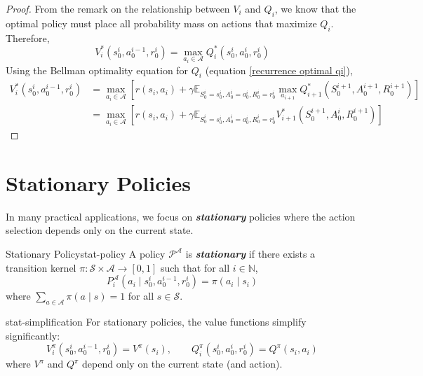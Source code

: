 \documentclass[a4paper, 11pt]{article}
\numberwithin{equation}{section}
\theoremstyle{plain}
\theoremstyle{definition}
\newcommand{\E}{{\mathbb E}}
\newcommand{\1}{{\mathbbm 1}}
\newcommand{\mc}[1]{\mathcal{#1}}
\newcommand{\bi}[1]{\textbf{\textit{#1}}}
\newcommand{\N}{{\mathbb{N}}}
\begin{document}
	\begin{proof}
		From the remark on the relationship between $V_i$ and $Q_i$, we know that the optimal policy must place all probability mass on actions that maximize $Q_i$. Therefore,
		\begin{equation*}
			V_i^{*}(s_0^i, a_0^{i-1}, r_0^i) = \max_{a_i \in \mc{A}} Q_i^{*}(s_0^i, a_0^{i}, r_0^i)
		\end{equation*}
		Using the Bellman optimality equation for $Q_i$ (equation \eqref{recurrence optimal qi}),
		\begin{equation*}
			\begin{split}
				V_i^{*}(s_0^i, a_0^{i-1}, r_0^i) &= \max_{a_i \in \mc{A}} \left[ r(s_i, a_i) + \gamma\E_{S_0^i = s_0^i, A_0^{i} = a_0^{i}, R_0^i = r_0^i} \max_{a_{i + 1}} Q_{i + 1}^{*}(S_0^{i+1}, A_0^{i+1}, R_0^{i+1}) \right]\\
				&= \max_{a_i \in \mc{A}} \left[ r(s_i, a_i) + \gamma\E_{S_0^i = s_0^i, A_0^{i} = a_0^{i}, R_0^i = r_0^i} V_{i + 1}^{*}(S_0^{i+1}, A_0^{i}, R_0^{i+1}) \right]
			\end{split}
		\end{equation*}
	\end{proof}
	
	\section{Stationary Policies}
	
	In many practical applications, we focus on \bi{stationary} policies where the action selection depends only on the current state.
	
	\begin{fdefi}{Stationary Policy}{stat-policy}
		A policy $\mc{P}^{\mc{A}}$ is \bi{stationary} if there exists a transition kernel $\pi: \mc{S} \times \mc{A} \to [0,1]$ such that for all $i \in \N$,
		\begin{equation}
			P^{\mc{A}}_{i}(a_i\;|\; s_0^{i}, a_0^{i-1}, r_0^{i}) = \pi(a_i\;|\; s_i)
		\end{equation}
		where $\sum_{a \in \mc{A}} \pi(a\;|\; s) = 1$ for all $s \in \mc{S}$.
	\end{fdefi}
	
	\begin{frema}{}{stat-simplification}
		For stationary policies, the value functions simplify significantly:
		\begin{equation}
			V_i^{\pi}(s_0^i, a_0^{i-1}, r_0^i) = V^{\pi}(s_i), \qquad Q_i^{\pi}(s_0^i, a_0^{i}, r_0^i) = Q^{\pi}(s_i, a_i)
		\end{equation}
		where $V^{\pi}$ and $Q^{\pi}$ depend only on the current state (and action).
	\end{frema}
	
\end{document}
